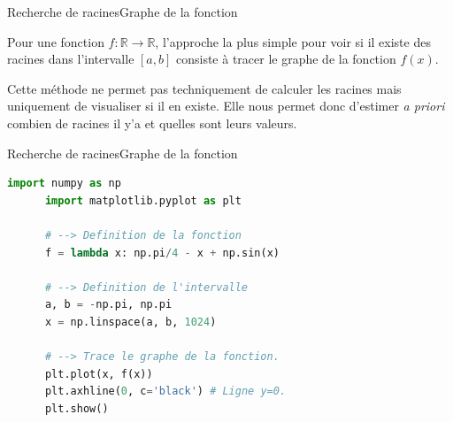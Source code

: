 \documentclass[usenames,dvipsnames,svgnames,10pt,aspectratio=169]{beamer}
\begin{document}
\begin{frame}[t, c]{Recherche de racines}{Graphe de la fonction}
  \begin{minipage}{.68\textwidth}
    Pour une fonction $f : \mathbb{R} \to \mathbb{R}$, l'approche la plus simple pour voir si il existe des racines dans l'intervalle $\left[a, b\right]$ consiste à tracer le graphe de la fonction $f(x)$.

    \bigskip

    Cette méthode ne permet pas techniquement de calculer les racines mais uniquement de visualiser si il en existe.
    Elle nous permet donc d'estimer \emph{a priori} combien de racines il y'a et quelles sont leurs valeurs.
  \end{minipage}%
  \hfill
  \begin{minipage}{.28\textwidth}
    \centering
  \end{minipage}

  \vspace{1cm}
\end{frame}


\begin{frame}[t, c, fragile]{Recherche de racines}{Graphe de la fonction}
  \begin{minipage}{.68\textwidth}
    \begin{lstlisting}[language=Python]
      import numpy as np
      import matplotlib.pyplot as plt

      # --> Definition de la fonction
      f = lambda x: np.pi/4 - x + np.sin(x)

      # --> Definition de l'intervalle
      a, b = -np.pi, np.pi
      x = np.linspace(a, b, 1024)

      # --> Trace le graphe de la fonction.
      plt.plot(x, f(x))
      plt.axhline(0, c='black') # Ligne y=0.
      plt.show()
    \end{lstlisting}
  \end{minipage}%
  \hfill
  \begin{minipage}{.28\textwidth}
    \centering

  \end{minipage}
\end{frame}
\end{document}

